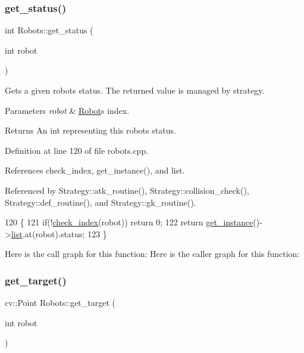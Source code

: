 \subsubsection{\texorpdfstring{get\+\_\+status()}{get\_status()}}
{\footnotesize\ttfamily int Robots\+::get\+\_\+status (\begin{DoxyParamCaption}\item[{int}]{robot }\end{DoxyParamCaption})\hspace{0.3cm}{\ttfamily [static]}}

Gets a given robot\textquotesingle{}s status. The returned value is managed by strategy. 
\begin{DoxyParams}{Parameters}
{\em robot} & \hyperlink{struct_robots_1_1_robot}{Robot}\textquotesingle{}s index. \\
\hline
\end{DoxyParams}
\begin{DoxyReturn}{Returns}
An int representing this robot\textquotesingle{}s status. 
\end{DoxyReturn}


Definition at line 120 of file robots.\+cpp.



References check\+\_\+index, get\+\_\+instance(), and list.



Referenced by Strategy\+::atk\+\_\+routine(), Strategy\+::collision\+\_\+check(), Strategy\+::def\+\_\+routine(), and Strategy\+::gk\+\_\+routine().


\begin{DoxyCode}
120                                 \{
121     \textcolor{keywordflow}{if}(!\hyperlink{robots_8hpp_ae3e6ae8f87cdc750c0b99bc609d9ae43}{check\_index}(robot)) \textcolor{keywordflow}{return} 0;
122     \textcolor{keywordflow}{return} \hyperlink{class_robots_a589bce74db5f34af384952d48435168f}{get\_instance}()->\hyperlink{class_robots_a2c6b77265028f82a4342ca1ef15ed305}{list}.at(robot).status;
123 \}
\end{DoxyCode}
Here is the call graph for this function\+:
Here is the caller graph for this function\+:
\mbox{\label{class_robots_a8a4fe339df4823e45cf34d9fb8daa64b}} 
\subsubsection{\texorpdfstring{get\+\_\+target()}{get\_target()}}
{\footnotesize\ttfamily cv\+::\+Point Robots\+::get\+\_\+target (\begin{DoxyParamCaption}\item[{int}]{robot }\end{DoxyParamCaption})\hspace{0.3cm}{\ttfamily [static]}}

